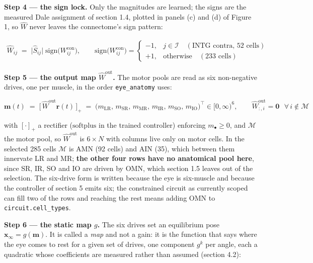 \documentclass[10pt]{article}
\begin{document}
\textbf{Step 4 --- the sign lock.} Only the magnitudes are learned; the signs are the
measured Dale assignment of section 1.4, plotted in panels (c) and (d) of Figure 1, so $\hat
W$ never leaves the connectome's sign pattern:

\begin{align}
\label{eq:sign-lock}
\hat{W}_{ij} \;=\; \big|\hat{S}_{ij}\big|\;\mathrm{sign}\big(W^{\mathrm{con}}_{ij}\big),
\qquad
\mathrm{sign}\big(W^{\mathrm{con}}_{ij}\big)=
\begin{cases}
-1, & j\in\mathcal{I} \quad(\text{INTG contra, } 52 \text{ cells})\\[2pt]
+1, & \text{otherwise} \quad(233 \text{ cells})
\end{cases}
\end{align}

\textbf{Step 5 --- the output map $\hat W^{\mathrm{out}}$.} The motor pools are read as six
non-negative drives, one per muscle, in the order \texttt{eye\_anatomy} uses:

\begin{equation}
\label{eq:output-map}
\mathbf{m}(t) \;=\; \big[\,\hat W^{\mathrm{out}}\mathbf{r}(t)\,\big]_{+}
\;=\;\big(m_{\mathrm{LR}},\,m_{\mathrm{SR}},\,m_{\mathrm{MR}},\,m_{\mathrm{IR}},\,m_{\mathrm{SO}},\,m_{\mathrm{IO}}\big)^{\!\top}\in[0,\infty)^{6},
\qquad
\hat W^{\mathrm{out}}_{:,i} = \mathbf{0}\ \ \ \forall\, i\notin\mathcal{M}
\end{equation}

with $[\cdot]_+$ a rectifier ($\mathrm{softplus}$ in the trained controller) enforcing
$m_\bullet\ge 0$, and $\mathcal{M}$ the motor pool, so $\hat W^{\mathrm{out}}$ is $6\times
N$ with columns live only on motor cells. In the selected 285 cells $\mathcal{M}$ is AMN (92
cells) and AIN (35), which between them innervate LR and MR; \textbf{the other four rows
have no anatomical pool here}, since SR, IR, SO and IO are driven by OMN, which section 1.5
leaves out of the selection. The six-drive form is written because the eye is six-muscle and
because the controller of section 5 emits six; the constrained circuit as currently scoped
can fill two of the rows and reaching the rest means adding OMN to
\texttt{circuit.cell\_types}.

\textbf{Step 6 --- the static map $g$.} The six drives set an equilibrium pose
$\mathbf{x}_\infty = g(\mathbf{m})$. It is called a \emph{map} and not a gain: it is the
function that says where the eye comes to rest for a given set of drives, one component
$g^{k}$ per angle, each a quadratic whose coefficients are measured rather than assumed
(section 4.2):
\end{document}
